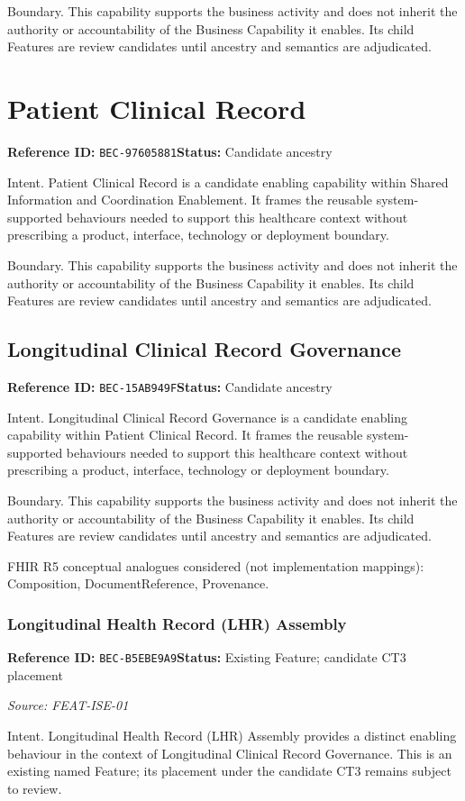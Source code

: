\documentclass[11pt,a4paper,openany]{book}
\begin{document}
Boundary. This capability supports the business activity and does not inherit the authority or accountability of the Business Capability it enables. Its child Features are review candidates until ancestry and semantics are adjudicated.

\section{Patient Clinical Record}\label{cap:bec-97605881}
\noindent\textbf{Reference ID:} \texttt{BEC-97605881}\quad \textbf{Status:} Candidate ancestry\par
Intent. Patient Clinical Record is a candidate enabling capability within Shared Information and Coordination Enablement. It frames the reusable system-supported behaviours needed to support this healthcare context without prescribing a product, interface, technology or deployment boundary.

Boundary. This capability supports the business activity and does not inherit the authority or accountability of the Business Capability it enables. Its child Features are review candidates until ancestry and semantics are adjudicated.

\subsection{Longitudinal Clinical Record Governance}\label{cap:bec-15ab949f}
\noindent\textbf{Reference ID:} \texttt{BEC-15AB949F}\quad \textbf{Status:} Candidate ancestry\par
Intent. Longitudinal Clinical Record Governance is a candidate enabling capability within Patient Clinical Record. It frames the reusable system-supported behaviours needed to support this healthcare context without prescribing a product, interface, technology or deployment boundary.

Boundary. This capability supports the business activity and does not inherit the authority or accountability of the Business Capability it enables. Its child Features are review candidates until ancestry and semantics are adjudicated.

FHIR R5 conceptual analogues considered (not implementation mappings): Composition, DocumentReference, Provenance.

\subsubsection{Longitudinal Health Record (LHR) Assembly}\label{cap:bec-b5ebe9a9}
\noindent\textbf{Reference ID:} \texttt{BEC-B5EBE9A9}\quad \textbf{Status:} Existing Feature; candidate CT3 placement\par
\noindent\textit{Source: FEAT-ISE-01}\par
Intent. Longitudinal Health Record (LHR) Assembly provides a distinct enabling behaviour in the context of Longitudinal Clinical Record Governance. This is an existing named Feature; its placement under the candidate CT3 remains subject to review.
\end{document}

